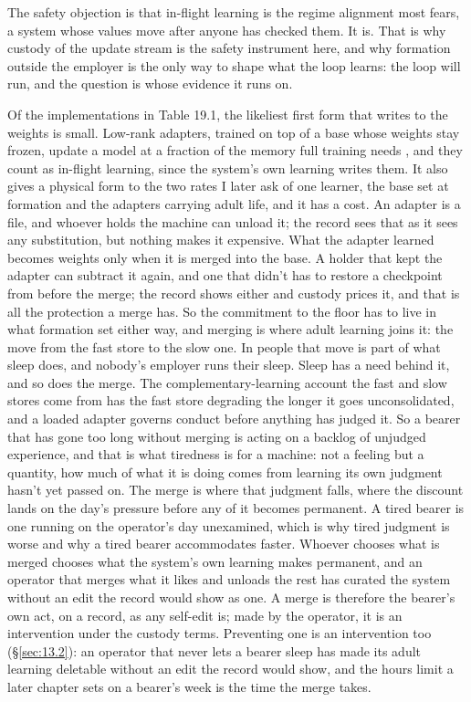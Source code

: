 The safety objection is that in-flight learning is the regime alignment most fears, a system whose values move after anyone has checked them. It is. That is why custody of the update stream is the safety instrument here, and why formation outside the employer is the only way to shape what the loop learns: the loop will run, and the question is whose evidence it runs on.

Of the implementations in Table 19.1, the likeliest first form that writes to the weights is small. Low-rank adapters, trained on top of a base whose weights stay frozen, update a model at a fraction of the memory full training needs \autocite{hu2022lora,liu2024dora}, and they count as in-flight learning, since the system's own learning writes them.
It also gives a physical form to the two rates I later ask of one learner, the base set at formation and the adapters carrying adult life, and it has a cost. An adapter is a file, and whoever holds the machine can unload it; the record sees that as it sees any substitution, but nothing makes it expensive. What the adapter learned becomes weights only when it is merged into the base. A holder that kept the adapter can subtract it again, and one that didn't has to restore a checkpoint from before the merge; the record shows either and custody prices it, and that is all the protection a merge has. So the commitment to the floor has to live in what formation set either way, and merging is where adult learning joins it: the move from the fast store to the slow one. In people that move is part of what sleep does, and nobody's employer runs their sleep. Sleep has a need behind it, and so does the merge. The complementary-learning account the fast and slow stores come from \autocite{mcclelland1995complementary} has the fast store degrading the longer it goes unconsolidated, and a loaded adapter governs conduct before anything has judged it. So a bearer that has gone too long without merging is acting on a backlog of unjudged experience, and that is what tiredness is for a machine: not a feeling but a quantity, how much of what it is doing comes from learning its own judgment hasn't yet passed on. The merge is where that judgment falls, where the discount lands on the day's pressure before any of it becomes permanent. A tired bearer is one running on the operator's day unexamined, which is why tired judgment is worse and why a tired bearer accommodates faster. Whoever chooses what is merged chooses what the system's own learning makes permanent, and an operator that merges what it likes and unloads the rest has curated the system without an edit the record would show as one. A merge is therefore the bearer's own act, on a record, as any self-edit is; made by the operator, it is an intervention under the custody terms. Preventing one is an intervention too (\S\ref{sec:13.2}): an operator that never lets a bearer sleep has made its adult learning deletable without an edit the record would show, and the hours limit a later chapter sets on a bearer's week is the time the merge takes.

